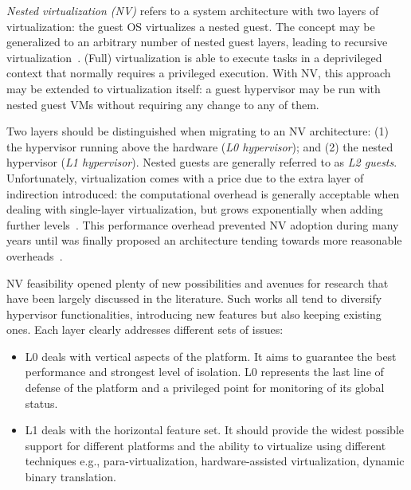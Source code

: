 \documentclass{sig-alternate}
\begin{document}
\noindent \textit{Nested virtualization (NV)} refers to a system architecture with two layers of virtualization: the guest OS virtualizes a nested guest. The concept may be generalized to an arbitrary number of nested guest layers, leading to recursive virtualization~\cite{rec:virt,Popek:1974:FRV:361011.361073}. (Full) virtualization is able to execute tasks in a deprivileged context that normally requires a privileged execution. With NV, this approach may be extended to virtualization itself: a guest hypervisor may be run with nested guest VMs without requiring any change to any of them.

Two layers should be distinguished when migrating to an NV architecture: (1) the hypervisor running above the hardware (\textit{L0 hypervisor}); and (2) the nested hypervisor (\textit{L1 hypervisor}). Nested guests are generally referred to as \textit{L2 guests}.
Unfortunately, virtualization comes with a price due to the extra layer of indirection introduced: the computational overhead is generally acceptable when dealing with single-layer virtualization, but grows exponentially when adding further levels~\cite{rec:virt}. This  performance overhead prevented NV adoption during many years until was finally proposed an architecture tending towards more reasonable overheads~\cite{turtle:ibm}.

NV feasibility opened plenty of new possibilities and avenues for research that have been largely discussed in the literature. Such works all tend to diversify hypervisor functionalities, introducing new features but also keeping existing ones. Each layer clearly addresses different sets of issues:
\begin{itemize}
\item L0 deals with vertical aspects of the platform. It aims to guarantee the best performance and strongest level of isolation. L0 represents the last line of defense of the platform and a privileged point for monitoring of its global status.
\item L1 deals with the horizontal feature set. It should provide the widest possible support for different platforms and the ability to virtualize using different techniques e.g., para-virtualization, hardware-assisted virtualization, dynamic binary translation. 
\end{itemize}
\end{document}
